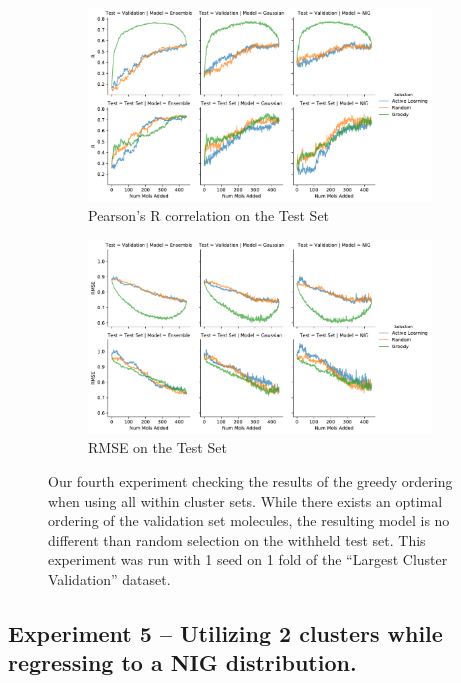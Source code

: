 \documentclass[journal=jmcmar,manuscript=article]{achemso}
\begin{document}
\begin{figure}[tbph]
    \centering
    \begin{subfigure}[b]{0.48\textwidth}
        \includegraphics[width=1\linewidth]{figures/fig4a_lc_greed_withvalid_R.pdf}
        \caption{Pearson's R correlation on the Test Set}
    \end{subfigure}%
    \hfill
    \begin{subfigure}[b]{0.48\textwidth}
        \includegraphics[width=1\linewidth]{figures/fig4a_lc_greed_withvalid_RMSE.pdf}
        \caption{RMSE on the Test Set}
    \end{subfigure}
    \caption{Our fourth experiment checking the results of the greedy ordering when using all within cluster sets. While there exists an optimal ordering of the validation set molecules, the resulting model is no different than random selection on the withheld test set. This experiment was run with 1 seed on 1 fold of the ``Largest Cluster Validation'' dataset.}
    \label{fig:lcgreedvalid}
\end{figure}

\subsection{Experiment 5 -- Utilizing 2 clusters while regressing to a NIG distribution.}
\end{document}
